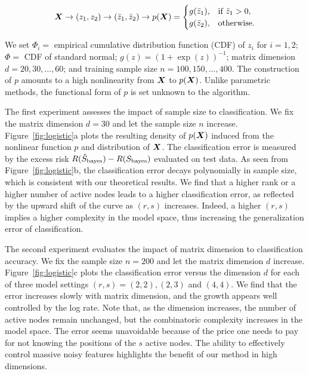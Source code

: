 \documentclass[11pt]{article}
\theoremstyle{plain}
\theoremstyle{definition}
\def\bayesS{S_{\textup{bayes}}}
\begin{document}
\begin{equation}
\bm X \to (z_1,z_2) \to 
(\bar z_1, \bar z_2)
\to p(\bm X)=
\begin{cases}
g(\bar z_1), & \text{if }\bar z_1>0,\\
g(\bar z_2), & \text{otherwise}. 
\end{cases}
\end{equation}

We set $\Phi_i = $ empirical cumulative distribution function (CDF) of $z_i$ for $i=1,2$; $\Phi = $ CDF of standard normal; $g(z)=(1+\exp(z))^{-1}$; matrix dimension $d=20,30,\ldots,60$; and training sample size $n=100, 150, \ldots, 400$. The construction of $p$ amounts to a high nonlinearity from $\bm X$ to $p(\bm X)$. Unlike parametric methods, the functional form of $p$ is set unknown to the algorithm. 

The first experiment assesses the impact of sample size to classification. We fix the matrix dimension $d=30$ and let the sample size $n$ increase. Figure~\ref{fig:logistic}a plots the resulting density of $p(\bm X)$ induced from the nonlinear function $p$ and distribution of $\bm X$. The classification error is measured by the excess risk $R(\hat S_{\text{bayes}})-R(\bayesS)$ evaluated on test data. As seen from Figure~\ref{fig:logistic}b, the classification error decays polynomially in sample size, which is consistent with our theoretical results. We find that a higher rank or a higher number of active nodes leads to a higher classification error, as reflected by the upward shift of the curve as $(r,s)$ increases. Indeed, a higher $(r,s)$ implies a higher complexity in the model space, thus increasing the generalization error of classification. 


The second experiment evaluates the impact of matrix dimension to classification accuracy. We fix the sample size $n=200$ and let the matrix dimension $d$ increase. Figure~\ref{fig:logistic}c plots the classification error versus the dimension $d$ for each of three model settings $(r,s)=(2,2), (2,3)$ and $(4,4)$. We find that the error increases slowly with matrix dimension, and the growth appears well controlled by the log rate. Note that, as the dimension increases, the number of active nodes remain unchanged, but the combinatoric complexity increases in the model space. The error seems unavoidable because of the price one needs to pay for not knowing the positions of the $s$ active nodes. The ability to effectively control massive noisy features highlights the benefit of our method in high dimensions. 
\end{document}
